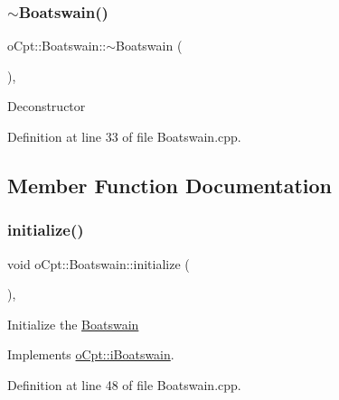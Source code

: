 \hypertarget{classo_cpt_1_1_boatswain_a0cff16b78dc5ee0e6b5d2169d693036f}{}\label{classo_cpt_1_1_boatswain_a0cff16b78dc5ee0e6b5d2169d693036f} 
\subsubsection{\texorpdfstring{$\sim$\+Boatswain()}{~Boatswain()}}
{\footnotesize\ttfamily o\+Cpt\+::\+Boatswain\+::$\sim$\+Boatswain (\begin{DoxyParamCaption}{ }\end{DoxyParamCaption})\hspace{0.3cm}{\ttfamily [override]}, {\ttfamily [virtual]}}

Deconstructor 

Definition at line 33 of file Boatswain.\+cpp.



\subsection{Member Function Documentation}
\hypertarget{classo_cpt_1_1_boatswain_aa1c27c710e2156402c3851ac189ea162}{}\label{classo_cpt_1_1_boatswain_aa1c27c710e2156402c3851ac189ea162} 
\subsubsection{\texorpdfstring{initialize()}{initialize()}}
{\footnotesize\ttfamily void o\+Cpt\+::\+Boatswain\+::initialize (\begin{DoxyParamCaption}{ }\end{DoxyParamCaption})\hspace{0.3cm}{\ttfamily [override]}, {\ttfamily [virtual]}}

Initialize the \hyperlink{classo_cpt_1_1_boatswain}{Boatswain} 

Implements \hyperlink{classo_cpt_1_1i_boatswain_a0749ff59de42e7a8a47586ab9d9ac98f}{o\+Cpt\+::i\+Boatswain}.



Definition at line 48 of file Boatswain.\+cpp.

\hypertarget{classo_cpt_1_1_boatswain_ae3f318352a331d64840ff87ad1ce3e8e}{}\label{classo_cpt_1_1_boatswain_ae3f318352a331d64840ff87ad1ce3e8e} 
